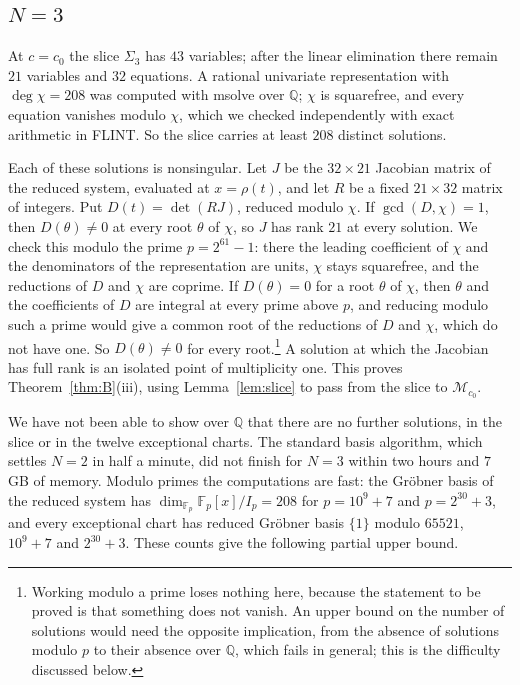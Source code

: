 \documentclass[11pt]{amsart}
\theoremstyle{definition}
\newcommand{\QQ}{\mathbb{Q}}
\newcommand{\cM}{\mathcal M}
\begin{document}
\subsection{\texorpdfstring{$N=3$}{N=3}}\label{ssec:N3}
At $c=c_0$ the slice $\Sigma_3$ has $43$ variables; after the linear elimination there remain $21$ variables and $32$ equations. A rational univariate representation with $\deg\chi=208$ was computed with msolve over $\QQ$; $\chi$ is squarefree, and every equation vanishes modulo $\chi$, which we checked independently with exact arithmetic in FLINT. So the slice carries at least $208$ distinct solutions.

Each of these solutions is nonsingular. Let $J$ be the $32\times21$ Jacobian matrix of the reduced system, evaluated at $x=\rho(t)$, and let $R$ be a fixed $21\times32$ matrix of integers. Put $D(t)=\det(RJ)$, reduced modulo $\chi$. If $\gcd(D,\chi)=1$, then $D(\theta)\ne0$ at every root $\theta$ of $\chi$, so $J$ has rank $21$ at every solution. We check this modulo the prime $p=2^{61}-1$: there the leading coefficient of $\chi$ and the denominators of the representation are units, $\chi$ stays squarefree, and the reductions of $D$ and $\chi$ are coprime. If $D(\theta)=0$ for a root $\theta$ of $\chi$, then $\theta$ and the coefficients of $D$ are integral at every prime above $p$, and reducing modulo such a prime would give a common root of the reductions of $D$ and $\chi$, which do not have one. So $D(\theta)\ne0$ for every root.\footnote{Working modulo a prime loses nothing here, because the statement to be proved is that something does not vanish. An upper bound on the number of solutions would need the opposite implication, from the absence of solutions modulo $p$ to their absence over $\QQ$, which fails in general; this is the difficulty discussed below.} A solution at which the Jacobian has full rank is an isolated point of multiplicity one. This proves Theorem~\ref{thm:B}(iii), using Lemma~\ref{lem:slice} to pass from the slice to $\cM_{c_0}$.

We have not been able to show over $\QQ$ that there are no further solutions, in the slice or in the twelve exceptional charts. The standard basis algorithm, which settles $N=2$ in half a minute, did not finish for $N=3$ within two hours and $7$ GB of memory. Modulo primes the computations are fast: the Gröbner basis of the reduced system has $\dim_{\mathbb F_p}\mathbb F_p[x]/I_p=208$ for $p=10^9+7$ and $p=2^{30}+3$, and every exceptional chart has reduced Gröbner basis $\{1\}$ modulo $65521$, $10^9+7$ and $2^{30}+3$. These counts give the following partial upper bound.
\end{document}
